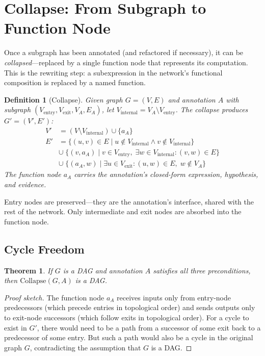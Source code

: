 \documentclass[11pt]{article}
\newtheorem{definition}{Definition}
\newtheorem{theorem}{Theorem}
\begin{document}
\section{Collapse: From Subgraph to Function Node}
\label{sec:collapse}

Once a subgraph has been annotated (and refactored if necessary), it can be \emph{collapsed}---replaced by a single function node that represents its computation. This is the rewriting step: a subexpression in the network's functional composition is replaced by a named function.

\begin{definition}[Collapse]
\label{def:collapse}
Given graph $G = (V, E)$ and annotation $A$ with subgraph $(V_{\text{entry}}, V_{\text{exit}}, V_A, E_A)$, let $V_{\text{internal}} = V_A \setminus V_{\text{entry}}$. The collapse produces $G' = (V', E')$:
\begin{align}
V' &= (V \setminus V_{\text{internal}}) \cup \{a_A\} \\
E' &= \{(u, v) \in E \mid u \notin V_{\text{internal}} \land v \notin V_{\text{internal}}\} \nonumber \\
   &\cup\; \{(v, a_A) \mid v \in V_{\text{entry}},\; \exists w \in V_{\text{internal}}\!: (v, w) \in E\} \nonumber \\
   &\cup\; \{(a_A, w) \mid \exists u \in V_{\text{exit}}\!: (u, w) \in E,\; w \notin V_A\} \nonumber
\end{align}
The function node $a_A$ carries the annotation's closed-form expression, hypothesis, and evidence.
\end{definition}

Entry nodes are preserved---they are the annotation's interface, shared with the rest of the network. Only intermediate and exit nodes are absorbed into the function node.

\subsection{Cycle Freedom}

\begin{theorem}
If $G$ is a DAG and annotation $A$ satisfies all three preconditions, then $\text{Collapse}(G, A)$ is a DAG.
\end{theorem}

\begin{proof}[Proof sketch]
The function node $a_A$ receives inputs only from entry-node predecessors (which precede entries in topological order) and sends outputs only to exit-node successors (which follow exits in topological order). For a cycle to exist in $G'$, there would need to be a path from a successor of some exit back to a predecessor of some entry. But such a path would also be a cycle in the original graph $G$, contradicting the assumption that $G$ is a DAG.
\end{proof}
\end{document}
